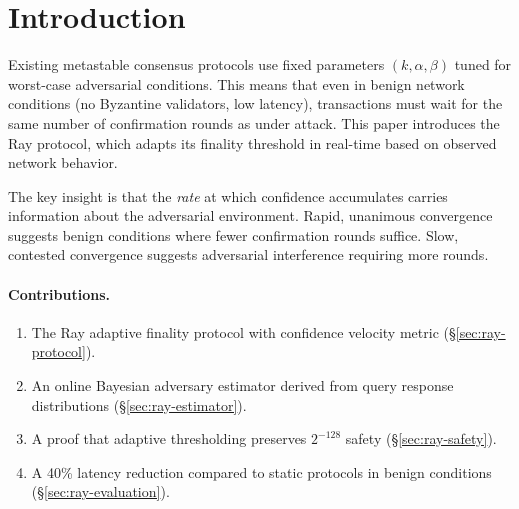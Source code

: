 \section{Introduction}

\label{sec:ray-introduction}

Existing metastable consensus protocols use fixed parameters $(k, \alpha, \beta)$ tuned
for worst-case adversarial conditions. This means that even in benign network conditions
(no Byzantine validators, low latency), transactions must wait for the same number of
confirmation rounds as under attack. This paper introduces the Ray protocol, which
adapts its finality threshold in real-time based on observed network behavior.

The key insight is that the \emph{rate} at which confidence accumulates carries
information about the adversarial environment. Rapid, unanimous convergence suggests
benign conditions where fewer confirmation rounds suffice. Slow, contested convergence
suggests adversarial interference requiring more rounds.

\paragraph{Contributions.}
\begin{enumerate}[nosep]
\item The Ray adaptive finality protocol with confidence velocity metric (\S\ref{sec:ray-protocol}).
\item An online Bayesian adversary estimator derived from query response distributions (\S\ref{sec:ray-estimator}).
\item A proof that adaptive thresholding preserves $2^{-128}$ safety (\S\ref{sec:ray-safety}).
\item A 40\% latency reduction compared to static protocols in benign conditions (\S\ref{sec:ray-evaluation}).
\end{enumerate}

